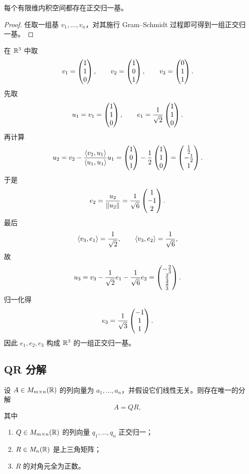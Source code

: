 \begin{corollary}
每个有限维内积空间都存在正交归一基。
\end{corollary}

\begin{proof}
任取一组基 $v_1,\dots,v_n$，对其施行 Gram--Schmidt 过程即可得到一组正交归一基。
\end{proof}

\begin{example}
在 $\mathbb{R}^3$ 中取
\[
v_1=\begin{pmatrix} 1\\1\\0 \end{pmatrix},\qquad v_2=\begin{pmatrix} 1\\0\\1 \end{pmatrix},\qquad v_3=\begin{pmatrix} 0\\1\\1 \end{pmatrix}.
\]
先取
\[
u_1=v_1=\begin{pmatrix} 1\\1\\0 \end{pmatrix},\qquad e_1=\frac{1}{\sqrt2}\begin{pmatrix} 1\\1\\0 \end{pmatrix}.
\]
再计算
\[
u_2=v_2-\frac{\langle v_2, u_1 \rangle}{\langle u_1, u_1 \rangle}u_1
=\begin{pmatrix} 1\\0\\1 \end{pmatrix}-\frac{1}{2}\begin{pmatrix} 1\\1\\0 \end{pmatrix}
=\begin{pmatrix} \tfrac12\\-\tfrac12\\1 \end{pmatrix}.
\]
于是
\[
e_2=\frac{u_2}{\|u_2\|}=\frac{1}{\sqrt6}\begin{pmatrix} 1\\-1\\2 \end{pmatrix}.
\]
最后
\[
\langle v_3, e_1 \rangle=\frac{1}{\sqrt2},\qquad \langle v_3, e_2 \rangle=\frac{1}{\sqrt6},
\]
故
\[
u_3=v_3-\frac{1}{\sqrt2}e_1-\frac{1}{\sqrt6}e_2
=\begin{pmatrix} -\tfrac23\\\tfrac23\\\tfrac23 \end{pmatrix}.
\]
归一化得
\[
e_3=\frac{1}{\sqrt3}\begin{pmatrix} -1\\1\\1 \end{pmatrix}.
\]
因此 $e_1,e_2,e_3$ 构成 $\mathbb{R}^3$ 的一组正交归一基。
\end{example}

\subsection{QR 分解}

\begin{theorem}[QR 分解]
设 $A\in M_{m\times n}(\mathbb{R})$ 的列向量为 $a_1,\dots,a_n$，并假设它们线性无关。则存在唯一的分解
\[
A=QR,
\]
其中
\begin{enumerate}[label=\textnormal{(\arabic*)}]
  \item $Q\in M_{m\times n}(\mathbb{R})$ 的列向量 $q_1,\dots,q_n$ 正交归一；
  \item $R\in M_n(\mathbb{R})$ 是上三角矩阵；
  \item $R$ 的对角元全为正数。
\end{enumerate}
\end{theorem}

